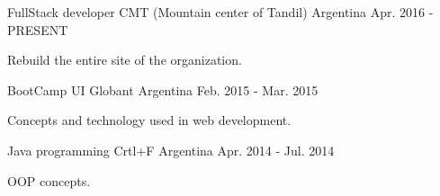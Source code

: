 


\begin{cventries}

\cventry
{FullStack developer} %
{CMT (Mountain center of Tandil)} %
{Argentina} %
{Apr. 2016 - PRESENT} %
{ %
\begin{cvitems}
\item {Rebuild the entire site of the organization.}
\end{cvitems}
}




\cventry
{BootCamp UI} %
{Globant} %
{Argentina} %
{Feb. 2015 - Mar. 2015} %
{ %
\begin{cvitems}
\item {Concepts and technology used in web development.}
\end{cvitems}
}


\cventry
{Java programming} %
{Crtl+F} %
{Argentina} %
{Apr. 2014 - Jul. 2014} %
{ %
\begin{cvitems}
\item {OOP concepts.}
\end{cvitems}
}


\end{cventries}

